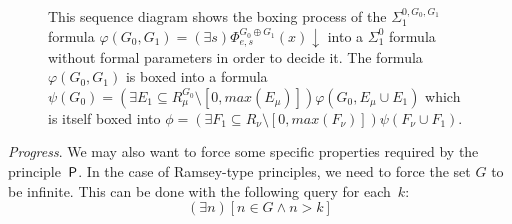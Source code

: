 \begin{figure}[htbp]
\begin{center}

\end{center}
\caption{This sequence diagram shows the boxing process of the $\Sigma^{0,G_0, G_1}_1$ formula
	$\varphi(G_0, G_1) = (\exists s)\Phi^{G_0 \oplus G_1}_{e,s}(x) \downarrow$ into
	a $\Sigma^0_1$ formula without formal parameters in order to decide it.
	The formula $\varphi(G_0, G_1)$ is boxed into a formula  
	$\psi(G_0) = (\exists E_1 \subseteq R^{G_0}_\mu \setminus [0, max(E_\mu)])\varphi(G_0, E_\mu \cup E_1)$
	which is itself boxed into $\phi = (\exists F_1 \subseteq R_\nu \setminus [0, max(F_\nu)])\psi(F_\nu \cup F_1)$.
} \label{fig:boxing-sequence}
\end{figure}

\smallskip
\emph{Progress}. We may also want to force some specific properties required by the principle~$\mathsf{P}$.
In the case of Ramsey-type principles, we need to force the set $G$ to be infinite. This can be done
with the following query for each~$k$:
\[
(\exists n)[n \in G \wedge n > k]
\]

